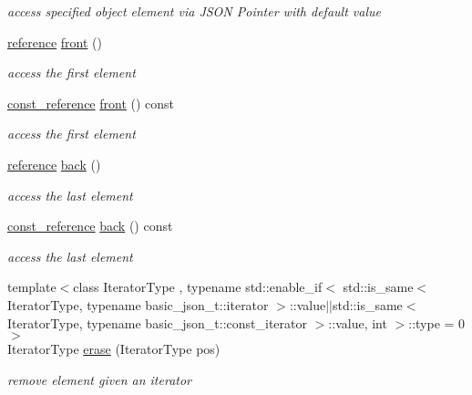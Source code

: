 \begin{DoxyCompactItemize}
\begin{DoxyCompactList}\small\item\em access specified object element via J\+S\+ON Pointer with default value \end{DoxyCompactList}\item 
\hyperlink{classnlohmann_1_1basic__json_a220ae98554a76205fb7f8822d36b2d5a}{reference} \hyperlink{classnlohmann_1_1basic__json_a5417ca43ae5e7a3a2f82eee2d915c6ed}{front} ()
\begin{DoxyCompactList}\small\item\em access the first element \end{DoxyCompactList}\item 
\hyperlink{classnlohmann_1_1basic__json_ab8a1c33ee7b154fc41ca2545aa9724e6}{const\+\_\+reference} \hyperlink{classnlohmann_1_1basic__json_a5ac8f974c178cf9326b6765e22f50eb6}{front} () const
\begin{DoxyCompactList}\small\item\em access the first element \end{DoxyCompactList}\item 
\hyperlink{classnlohmann_1_1basic__json_a220ae98554a76205fb7f8822d36b2d5a}{reference} \hyperlink{classnlohmann_1_1basic__json_a30914ad0767ccdc3633f88a906ed7dfa}{back} ()
\begin{DoxyCompactList}\small\item\em access the last element \end{DoxyCompactList}\item 
\hyperlink{classnlohmann_1_1basic__json_ab8a1c33ee7b154fc41ca2545aa9724e6}{const\+\_\+reference} \hyperlink{classnlohmann_1_1basic__json_aac965b84ea43ccd8aef9caefef02794a}{back} () const
\begin{DoxyCompactList}\small\item\em access the last element \end{DoxyCompactList}\item 
{\footnotesize template$<$class Iterator\+Type , typename std\+::enable\+\_\+if$<$ std\+::is\+\_\+same$<$ Iterator\+Type, typename basic\+\_\+json\+\_\+t\+::iterator $>$\+::value$\vert$$\vert$std\+::is\+\_\+same$<$ Iterator\+Type, typename basic\+\_\+json\+\_\+t\+::const\+\_\+iterator $>$\+::value, int $>$\+::type  = 0$>$ }\\Iterator\+Type \hyperlink{classnlohmann_1_1basic__json_a494632b69bbe1d0153d3bedad0901b8e}{erase} (Iterator\+Type pos)
\begin{DoxyCompactList}\small\item\em remove element given an iterator \end{DoxyCompactList}\item 

\end{DoxyCompactItemize}
